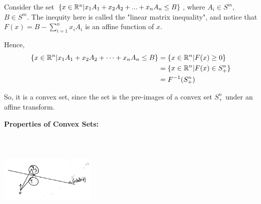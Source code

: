 \begin{example}
Consider the set $\{x\in \mathbb{R}^n | x_1A_1 + x_2A_2 + ... + x_nA_n \leq B\}$, where $A_i\in S^m$, $B\in S^m$. The inequity here is called the "linear matrix inequality", and notice that $F(x) = B - \sum^n_{i=1}x_iA_i$ is an affine function of $x$. 

Hence,
\begin{align*}
\{x\in \mathbb{R}^n | x_1A_1 + x_2A_2 +\cdots + x_nA_n \leq B\}
 &= \{x\in \mathbb{R}^n | F(x)\geq 0\}\\
 &= \{x\in \mathbb{R}^n | F(x)\in S^n_+ \}\\
 &=F^{-1}(S^n_+)
\end{align*}

So, it is a convex set, since the set is the pre-images of a convex set $S_+^n$ under an affine transform.
\end{example}

\vspace{0.5cm}
\textbf{Properties of Convex Sets:}

\begin{marginfigure}
	\centering
	\includegraphics[width=1.8in,height=1.8in]{figures/ch08/figure1030_2.png}
\end{marginfigure}


